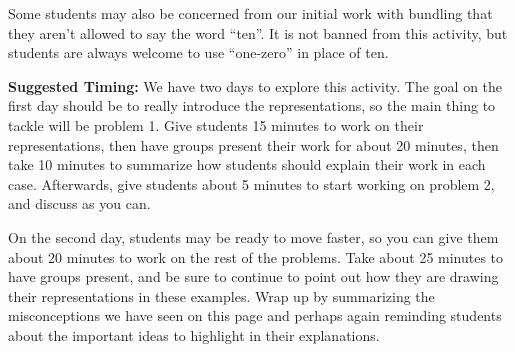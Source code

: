 \documentclass[nooutcomes,noauthor,handout]{ximera}
\begin{document}
\begin{instructorNotes}
Some students may also be concerned from our initial work with bundling that they aren't allowed to say the word ``ten''. It is not banned from this activity, but students are always welcome to use ``one-zero'' in place of ten.



{\bf Suggested Timing:} We have two days to explore this activity. The goal on the first day should be to really introduce the representations, so the main thing to tackle will be problem 1. Give students 15 minutes to work on their representations, then have groups present their work for about 20 minutes, then take 10 minutes to summarize how students should explain their work in each case. Afterwards, give students about 5 minutes to start working on problem 2, and discuss as you can.

On the second day, students may be ready to move faster, so you can give them about 20 minutes to work on the rest of the problems. Take about 25 minutes to have groups present, and be sure to continue to point out how they are drawing their representations in these examples. Wrap up by summarizing the misconceptions we have seen on this page and perhaps again reminding students about the important ideas to highlight in their explanations.
\end{instructorNotes}
\end{document}
